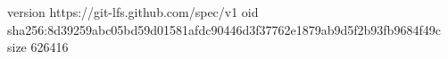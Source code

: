 version https://git-lfs.github.com/spec/v1
oid sha256:8d39259abc05bd59d01581afdc90446d3f37762e1879ab9d5f2b93fb9684f49c
size 626416
